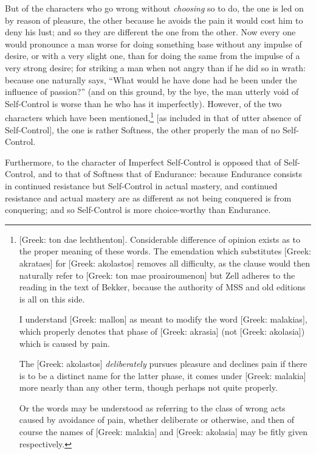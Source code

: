 But of the characters who go wrong without \emph{choosing} so to do, the one is
led on by reason of pleasure, the other because he avoids the pain it would
cost him to deny his lust; and so they are different the one from the other.
Now every one would pronounce a man worse for doing something base without any
impulse of desire, or with a very slight one, than for doing the same from the
impulse of a very strong desire; for striking a man when not angry than if he
did so in wrath: because one naturally says, “What would he have done had
he been under the influence of passion?” (and on this ground, by the bye,
the man utterly void of Self-Control is worse than he who has it imperfectly).
However, of the two characters which have been mentioned,\footnote{[Greek: ton dae lechthenton]. Considerable difference of opinion exists as to
the proper meaning of these words. The emendation which substitutes [Greek:
akrataes] for [Greek: akolastos] removes all difficulty, as the clause would
then naturally refer to [Greek: ton mae proairoumenon] but Zell adheres to the
reading in the text of Bekker, because the authority of MSS and old editions is
all on this side.

I understand [Greek: mallon] as meant to modify the word [Greek: malakias],
which properly denotes that phase of [Greek: akrasia] (not [Greek: akolasia])
which is caused by pain.

The [Greek: akolastos] \emph{deliberately} pursues pleasure and declines
pain if there is to be a distinct name for the latter phase, it comes under
[Greek: malakia] more nearly than any other term, though perhaps not quite
properly.

Or the words may be understood as referring to the class of wrong acts
caused by avoidance of pain, whether deliberate or otherwise, and then of
course the names of [Greek: malakia] and [Greek: akolasia] may be fitly given
respectively.}
[as included in that of utter absence of Self-Control], the one is rather
Softness, the other properly the man of no Self-Control.

Furthermore, to the character of Imperfect Self-Control is opposed that of
Self-Control, and to that of Softness that of Endurance: because Endurance
consists in continued resistance but Self-Control in actual mastery, and
continued resistance and actual mastery are as different as not being conquered
is from conquering; and so Self-Control is more choice-worthy than Endurance.


